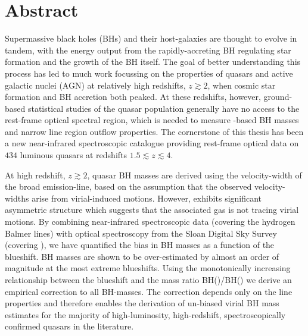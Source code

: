 \begingroup
\let\clearpage\relax
\let\cleardoublepage\relax
\let\cleardoublepage\relax

\chapter*{Abstract}

Supermassive black holes (BHs) and their host-galaxies are thought to evolve in tandem, with the energy output from the rapidly-accreting BH regulating star formation and the growth of the BH itself. 
The goal of better understanding this process has led to much work focussing on the properties of quasars and active galactic nuclei (AGN) at relatively high redshifts, $z\gtrsim 2$, when cosmic star formation and BH accretion both peaked. 
At these redshifts, however, ground-based statistical studies of the quasar population generally have no access to the rest-frame optical spectral region, which is needed to measure \hbns-based BH masses and narrow line region outflow properties. 
The cornerstone of this thesis has been a new near-infrared spectroscopic catalogue providing rest-frame optical data on $434$ luminous quasars at redshifts $1.5 \lesssim z \lesssim 4$.

At high redshift, $z \gtrsim 2$, quasar BH masses are derived using the velocity-width of the  broad emission-line, based on the assumption that the observed velocity-widths arise from virial-induced motions.  
However,  exhibits significant asymmetric structure which suggests that the associated gas is not tracing virial motions. 
By combining near-infrared spectroscopic data (covering the hydrogen Balmer lines) with optical spectroscopy from the Sloan Digital Sky Survey (covering ), we have quantified the bias in  BH masses as a function of the  blueshift. 
 BH masses are shown to be over-estimated by almost an order of magnitude at the most extreme blueshifts.
Using the monotonically increasing relationship between the  blueshift and the mass ratio BH()/BH(\hans) we derive an empirical correction to all  BH-masses.
The correction depends only on the  line properties and therefore enables the derivation of un-biased virial BH mass estimates for the majority of high-luminosity, high-redshift, spectroscopically confirmed quasars in the literature. 

